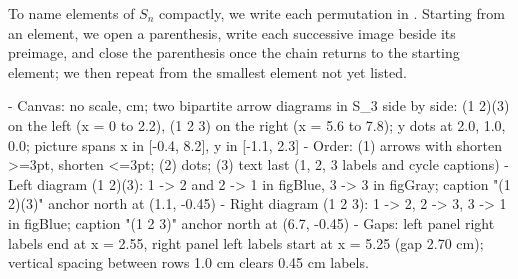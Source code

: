 \begin{content}
To name elements of $S_n$ compactly, we write each permutation in . Starting from an element, we open a parenthesis, write each successive image beside its preimage, and close the parenthesis once the chain returns to the starting element; we then repeat from the smallest element not yet listed.


\begin{hidden}
- Canvas: no scale, cm; two bipartite arrow diagrams in S_3 side by side: (1 2)(3) on the left (x = 0 to 2.2),
  (1 2 3) on the right (x = 5.6 to 7.8); y dots at 2.0, 1.0, 0.0; picture spans x in [-0.4, 8.2], y in [-1.1, 2.3]
- Order: (1) arrows with shorten >=3pt, shorten <=3pt; (2) dots; (3) text last (1, 2, 3 labels and cycle captions)
- Left diagram (1 2)(3): 1 -> 2 and 2 -> 1 in figBlue, 3 -> 3 in figGray; caption "(1 2)(3)" anchor north at (1.1, -0.45)
- Right diagram (1 2 3): 1 -> 2, 2 -> 3, 3 -> 1 in figBlue; caption "(1 2 3)" anchor north at (6.7, -0.45)
- Gaps: left panel right labels end at x = 2.55, right panel left labels start at x = 5.25 (gap 2.70 cm);
  vertical spacing between rows 1.0 cm clears 0.45 cm labels.
\end{hidden}
\begin{center}
\end{center}
\end{content}
